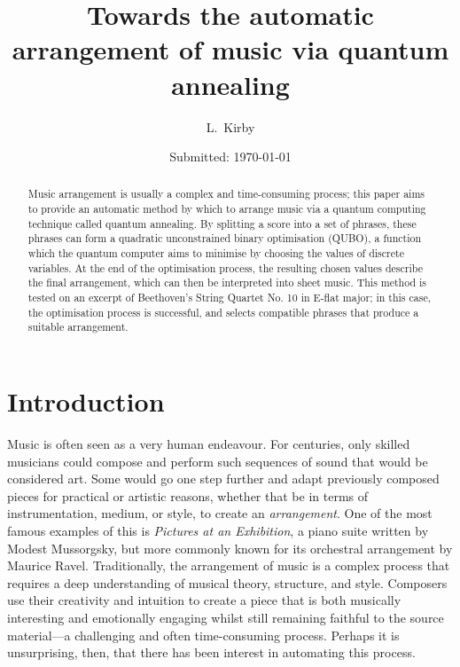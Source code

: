 \documentclass[aps,pra,10pt,twocolumn]{revtex4-2}
\begin{document}
\title{Towards the automatic arrangement of music via quantum annealing}
\author{L.\ Kirby} %
\date{Submitted: \today{}} %

\begin{abstract}              

Music arrangement is usually a complex and time-consuming process; this paper aims to provide an automatic method by which to arrange music via a quantum computing technique called quantum annealing. By splitting a score into a set of phrases, these phrases can form a quadratic unconstrained binary optimisation (QUBO), a function which the quantum computer aims to minimise by choosing the values of discrete variables. At the end of the optimisation process, the resulting chosen values describe the final arrangement, which can then be interpreted into sheet music. This method is tested on an excerpt of Beethoven's String Quartet No. 10 in E-flat major; in this case, the optimisation process is successful, and selects compatible phrases that produce a suitable arrangement.

\end{abstract}

\maketitle

\thispagestyle{plain} %

\section{Introduction} 

Music is often seen as a very human endeavour. For centuries, only skilled musicians could compose and perform such sequences of sound that would be considered art. Some would go one step further and adapt previously composed pieces for practical or artistic reasons, whether that be in terms of instrumentation, medium, or style, to create an \textit{arrangement}. One of the most famous examples of this is \textit{Pictures at an Exhibition}, a piano suite written by Modest Mussorgsky, but more commonly known for its orchestral arrangement by Maurice Ravel.
Traditionally, the arrangement of music is a complex process that requires a deep understanding of musical theory, structure, and style. Composers use their creativity and intuition to create a piece that is both musically interesting and emotionally engaging whilst still remaining faithful to the source material—a challenging and often time-consuming process. Perhaps it is unsurprising, then, that there has been interest in automating this process.
\end{document}
